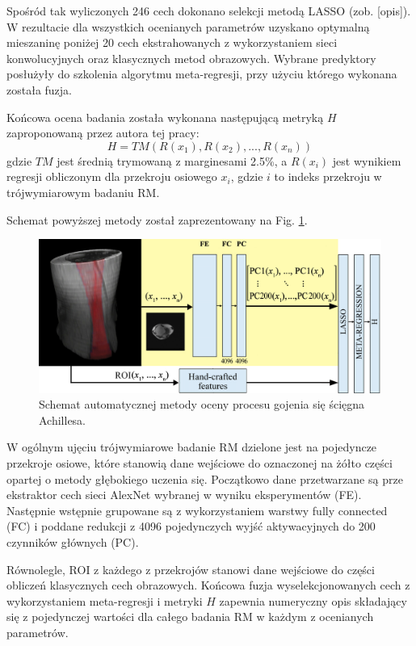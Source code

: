 Spośród tak wyliczonych 246 cech dokonano selekcji metodą LASSO (zob. [opis]). W rezultacie dla wszystkich ocenianych parametrów uzyskano optymalną mieszaninę poniżej 20 cech ekstrahowanych z wykorzystaniem sieci konwolucyjnych oraz klasycznych metod obrazowych. Wybrane predyktory posłużyły do szkolenia algorytmu meta-regresji, przy użyciu którego wykonana została fuzja.   

Końcowa ocena badania została wykonana następującą metryką $H$ zaproponowaną przez autora tej pracy:
\begin{equation}
\label{ecq:H}
H = TM(R(x_1), R(x_2),..., R(x_n))
\end{equation}
gdzie $TM$ jest średnią trymowaną z marginesami 2.5\%, a $R(x_i)$ jest wynikiem regresji obliczonym dla przekroju osiowego $x_i$, gdzie $i$ to indeks przekroju w trójwymiarowym badaniu RM.

Schemat powyższej metody został zaprezentowany na Fig. \ref{fig:net}. 
\begin{figure}[h!]
	\includegraphics[width=\textwidth]{figures/net.jpg}
	\caption{Schemat automatycznej metody oceny procesu gojenia się ścięgna Achillesa.} \label{fig:net}
\end{figure}
W ogólnym ujęciu trójwymiarowe badanie RM dzielone jest na pojedyncze przekroje osiowe, które stanowią dane wejściowe do oznaczonej na żółto części opartej o metody głębokiego uczenia się. Początkowo dane przetwarzane są prze ekstraktor cech sieci AlexNet wybranej w wyniku eksperymentów (FE). Następnie wstępnie grupowane są z wykorzystaniem warstwy fully connected (FC) i poddane redukcji z 4096 pojedynczych wyjść aktywacyjnych do 200 czynników głównych (PC).

Równolegle, ROI z każdego z przekrojów stanowi dane wejściowe do części obliczeń klasycznych cech obrazowych. Końcowa fuzja wyselekcjonowanych cech z wykorzystaniem meta-regresji i metryki $H$ zapewnia numeryczny opis składający się z pojedynczej wartości dla całego badania RM w każdym z ocenianych parametrów.

